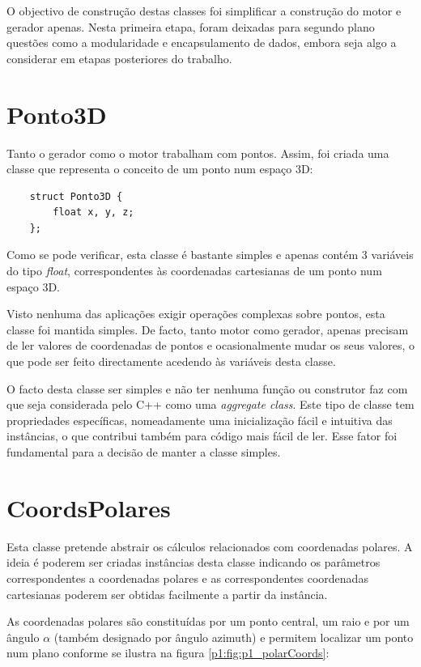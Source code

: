 O objectivo de construção destas classes foi simplificar a construção do motor e gerador apenas. Nesta primeira etapa, foram deixadas para segundo plano questões como a modularidade e encapsulamento de dados, embora seja algo a considerar em etapas posteriores do trabalho.

\section{Ponto3D}

Tanto o gerador como o motor trabalham com pontos. Assim, foi criada uma classe que representa o conceito de um ponto num espaço 3D:

\begin{Verbatim}
	struct Ponto3D {
		float x, y, z;
	};
\end{Verbatim}

Como se pode verificar, esta classe é bastante simples e apenas contém 3 variáveis do tipo \textit{float}, correspondentes às coordenadas cartesianas de um ponto num espaço 3D.

Visto nenhuma das aplicações exigir operações complexas sobre pontos, esta classe foi mantida simples. De facto, tanto motor como gerador, apenas precisam de ler valores de coordenadas de pontos e ocasionalmente mudar os seus valores, o que pode ser feito directamente acedendo às variáveis desta classe.

O facto desta classe ser simples e não ter nenhuma função ou construtor faz com que seja considerada pelo C++ como uma \textit{aggregate class}. Este tipo de classe tem propriedades específicas, nomeadamente uma inicialização fácil e intuitiva das instâncias, o que contribui também para código mais fácil de ler. Esse fator foi fundamental para a decisão de manter a classe simples.

\newpage
\section{CoordsPolares}
\label{p1:coordsPolares}
Esta classe pretende abstrair os cálculos relacionados com coordenadas polares. A ideia é poderem ser criadas instâncias desta classe indicando os parâmetros correspondentes a coordenadas polares e as correspondentes coordenadas cartesianas poderem ser obtidas facilmente a partir da instância.

As coordenadas polares são constituídas por um ponto central, um raio e por um ângulo $\alpha$ (também designado por ângulo azimuth) e permitem localizar um ponto num plano conforme se ilustra na figura \ref{p1:fig:p1_polarCoords}:

